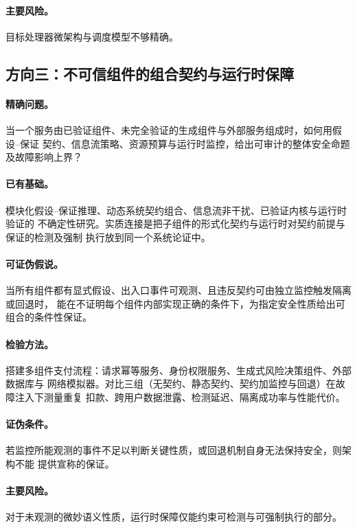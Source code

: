 \paragraph{主要风险。}
目标处理器微架构与调度模型不够精确。

\subsection*{方向三：不可信组件的组合契约与运行时保障}

\paragraph{精确问题。}
当一个服务由已验证组件、未完全验证的生成组件与外部服务组成时，如何用假设--保证
契约、信息流策略、资源预算与运行时监控，给出可审计的整体安全命题及故障影响上界？

\paragraph{已有基础。}
模块化假设--保证推理、动态系统契约组合、信息流非干扰、已验证内核与运行时验证的
不确定性研究。实质连接是把子组件的形式化契约与运行时对契约前提与保证的检测及强制
执行放到同一个系统论证中。

\paragraph{可证伪假说。}
当所有组件都有显式假设、出入口事件可观测、且违反契约可由独立监控触发隔离或回退时，
能在不证明每个组件内部实现正确的条件下，为指定安全性质给出可组合的条件性保证。

\paragraph{检验方法。}
搭建多组件支付流程：请求幂等服务、身份权限服务、生成式风险决策组件、外部数据库与
网络模拟器。对比三组（无契约、静态契约、契约加监控与回退）在故障注入下测量重复
扣款、跨用户数据泄露、检测延迟、隔离成功率与性能代价。

\paragraph{证伪条件。}
若监控所能观测的事件不足以判断关键性质，或回退机制自身无法保持安全，则架构不能
提供宣称的保证。

\paragraph{主要风险。}
对于未观测的微妙语义性质，运行时保障仅能约束可检测与可强制执行的部分。

